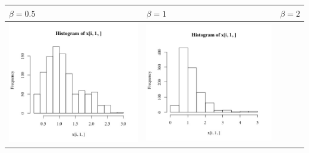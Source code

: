 \documentclass[11pt]{article}
\begin{document}
\begin{table}[h]
  \begin{center}
    \renewcommand{\arraystretch}{1.5}
    \begin{tabular}{| >{\centering\arraybackslash}m{2.1in} |  >{\centering\arraybackslash}m{2.1in} |  >{\centering\arraybackslash}m{2.1in}|}
      \hline
      $\beta=0.5$&$\beta=1$&$\beta=2$\\\hline
      \includegraphics[width=1\linewidth,height=0.18\textheight]{plot6-1}&
      \includegraphics[width=1\linewidth,height=0.18\textheight]{plot6-2}&

\end{tabular}
\end{center}
\end{table}
\end{document}
